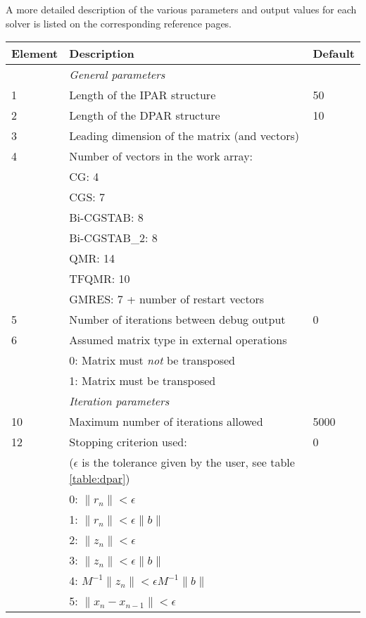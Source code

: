 \documentclass[11pt,a4paper,english,oneside]{report}
\begin{document}
A more detailed description of the various parameters and output values
for each solver is listed on the corresponding reference pages.

\begin{table}[H]

\begin{tabular*}{\textwidth}{lll}
\hline\hline
{\bfseries Element} & {\bfseries Description} & {\bfseries Default} \\
\hline\hline
	& {\em General parameters} 				& \\
\hline
1	& Length of the IPAR structure 				& 50 \\
2	& Length of the DPAR structure 				& 10 \\
3	& Leading dimension of the matrix (and vectors)		& \\
4	& Number of vectors in the {\ttfamily work} array: 	& \\
	& CG: 4 						& \\
	& CGS: 7 						& \\
	& Bi-CGSTAB: 8						& \\
	& Bi-CGSTAB\_2: 8					& \\
	& QMR: 14 						& \\
	& TFQMR: 10 						& \\
	& GMRES: 7 + number of restart vectors			& \\
5 	& Number of iterations between debug output 		& 0 \\
6 	& Assumed matrix type in external operations		& \\
	& 0: Matrix must {\em not} be transposed 		& \\
	& 1: Matrix must be transposed 				& \\
\hline
	& {\em Iteration parameters} 				& \\
\hline
10 	& Maximum number of iterations allowed 			& 5000 \\
12 	& Stopping criterion used: 				& 0 \\
	& ($\epsilon$ is the tolerance given by the user, see table \ref{table:dpar}) & \\
	& 0: $\|r_{n}\| < \epsilon$ 				& \\
	& 1: $\|r_{n}\| < \epsilon \|b\| $ 			& \\
	& 2: $\|z_{n}\| < \epsilon$ 				& \\
	& 3: $\|z_{n}\| < \epsilon \|b\| $ 			& \\
	& 4: $M^{-1}\|z_{n}\| < \epsilon M^{-1}\|b\| $ 		& \\
	& 5: $\|x_{n} - x_{n-1}\| < \epsilon $ 			& \\

\end{tabular*}
\end{table}
\end{document}
